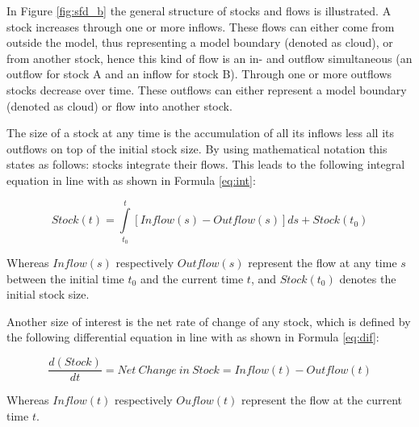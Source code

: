 In Figure \ref{fig:sfd_b} the general structure of stocks and flows is illustrated. A stock increases through one or more inflows. These flows can either come from outside the model, thus representing a model boundary (denoted as cloud), or from another stock, hence this kind of flow is an in- and outflow simultaneous (an outflow for stock A and an inflow for stock B). Through one or more outflows stocks decrease over time. These outflows can either represent a model boundary (denoted as cloud) or flow into another stock.

The size of a stock at any time is the accumulation of all its inflows less all its outflows on top of the initial stock size. By using mathematical notation this states as follows: stocks integrate their flows. This leads to the following integral equation in line with \citet[p. 194]{Sterman2000} as shown in  Formula \ref{eq:int}:

\begin{equation}\label{eq:int}
		Stock(t) = \int\limits_{t_0}^t [Inflow(s) - Outflow(s)]ds + Stock(t_0)
\end{equation}

Whereas $Inflow(s)$ respectively $Outflow(s)$ represent the flow at any time $s$ between the initial time $t_0$ and the current time $t$, and $Stock(t_0)$ denotes the initial stock size. 

Another size of interest is the net rate of change of any stock, which is defined by the following differential equation in line with \citet[p. 194]{Sterman2000} as shown in Formula \ref{eq:dif}:

\begin{equation}\label{eq:dif}
		\frac{d(Stock)}{dt} = \mathit{Net~Change~in~Stock} = Inflow(t) - Outflow(t)
\end{equation}

Whereas $Inflow(t)$ respectively $Ouflow(t)$ represent the flow at the current time $t$.

